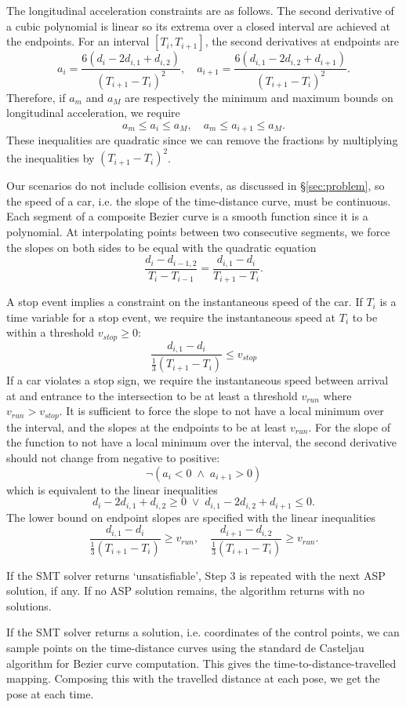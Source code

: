 The longitudinal acceleration constraints are as follows.
%
The second derivative of a cubic polynomial is linear so its extrema over a closed interval are achieved at the endpoints.
%
For an interval $[T_i, T_{i+1}]$, the second derivatives at endpoints are
$$
a_i = \frac{6(d_i-2d_{i,1}+d_{i,2})}{(T_{i+1}-T_i)^2}, \quad
a_{i+1} = \frac{6(d_{i,1}-2d_{i,2}+d_{i+1})}{(T_{i+1}-T_i)^2}.
$$
%
Therefore, if $a_m$ and $a_M$ are respectively the minimum and maximum bounds on longitudinal acceleration, we require
$$ a_m \leq a_i \leq a_M, \quad a_m \leq a_{i+1} \leq a_M.
$$
%
These inequalities are quadratic since we can remove the fractions by multiplying the inequalities by $(T_{i+1}-T_i)^2$.


Our scenarios do not include collision events, as discussed in \S\ref{sec:problem}, so the speed of a car, i.e. the slope of the time-distance curve, must be continuous.
%
Each segment of a composite Bezier curve is a smooth function since it is a polynomial.
%
At interpolating points between two consecutive segments, we force the slopes on both sides to be equal with the quadratic equation
$$ \frac{d_i-d_{i-1,2}}{T_i-T_{i-1}} = \frac{d_{i,1}-d_i}{T_{i+1}-T_i}.
$$

A stop event implies a constraint on the instantaneous speed of the car.
%
If $T_i$ is a time variable for a stop event, we require the instantaneous speed at $T_i$ to be within a threshold $v_{stop} \geq 0$:
$$ \frac{d_{i,1}-d_i}{\frac{1}{3}(T_{i+1}-T_i)} \leq v_{stop} $$
%
If a car violates a stop sign, we require the instantaneous speed between arrival at and entrance to the intersection to be at least a threshold $v_{run}$ where $v_{run} > v_{stop}$.
%
It is sufficient to force the slope to not have a local minimum over the interval, and the slopes at the endpoints to be at least $v_{run}$.
%
For the slope of the function to not have a local minimum over the interval, the second derivative should not change from negative to positive:
$$
\lnot (a_i < 0 \;\land\; a_{i+1} > 0)
$$
which is equivalent to the linear inequalities
$$ d_i-2d_{i,1}+d_{i,2} \geq 0 \;\lor\; d_{i,1}-2d_{i,2}+d_{i+1} \leq 0.
$$
%
The lower bound on endpoint slopes are specified with the linear inequalities
$$ \frac{d_{i,1}-d_i}{\frac{1}{3}(T_{i+1}-T_i)} \geq v_{run}, \quad \frac{d_{i+1}-d_{i,2}}{\frac{1}{3}(T_{i+1}-T_i)} \geq v_{run}.
$$

If the SMT solver returns `unsatisfiable', Step 3 is repeated with the next ASP solution, if any.
%
If no ASP solution remains, the algorithm returns with no solutions.

If the SMT solver returns a solution, i.e. coordinates of the control points, we can sample points on the time-distance curves using the standard de Casteljau algorithm for Bezier curve computation.
%
This gives the time-to-distance-travelled mapping.
%
Composing this with the travelled distance at each pose, we get the pose at each time.